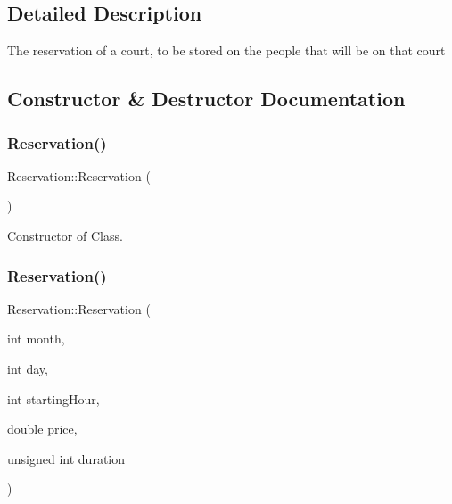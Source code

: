 \subsection{Detailed Description}
The reservation of a court, to be stored on the people that will be on that court 

\subsection{Constructor \& Destructor Documentation}
\mbox{\label{class_reservation_a63b283053695e6f50fa44c50da2b3de5}} 
\subsubsection{\texorpdfstring{Reservation()}{Reservation()}\hspace{0.1cm}{\footnotesize\ttfamily [1/2]}}
{\footnotesize\ttfamily Reservation\+::\+Reservation (\begin{DoxyParamCaption}{ }\end{DoxyParamCaption})\hspace{0.3cm}{\ttfamily [inline]}}



Constructor of Class. 

\mbox{\label{class_reservation_ac060bb57009704f7cfe33bed498b72d0}} 
\subsubsection{\texorpdfstring{Reservation()}{Reservation()}\hspace{0.1cm}{\footnotesize\ttfamily [2/2]}}
{\footnotesize\ttfamily Reservation\+::\+Reservation (\begin{DoxyParamCaption}\item[{int}]{month,  }\item[{int}]{day,  }\item[{int}]{starting\+Hour,  }\item[{double}]{price,  }\item[{unsigned int}]{duration }\end{DoxyParamCaption})}



